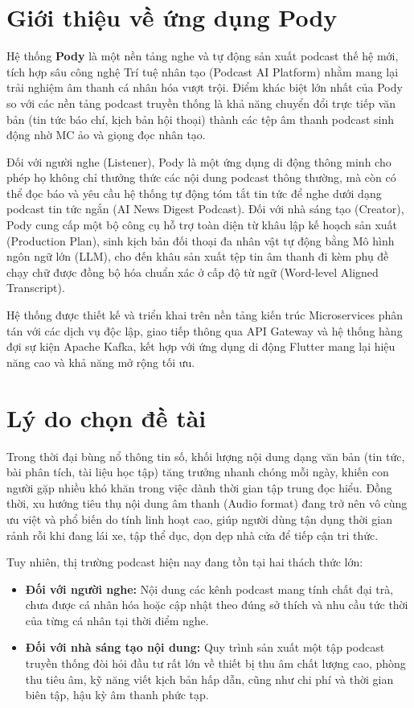 \documentclass[12pt,a4paper]{report}
\begin{document}
\section{Giới thiệu về ứng dụng Pody}
Hệ thống \textbf{Pody} là một nền tảng nghe và tự động sản xuất podcast thế hệ mới, tích hợp sâu công nghệ Trí tuệ nhân tạo (Podcast AI Platform) nhằm mang lại trải nghiệm âm thanh cá nhân hóa vượt trội. Điểm khác biệt lớn nhất của Pody so với các nền tảng podcast truyền thống là khả năng chuyển đổi trực tiếp văn bản (tin tức báo chí, kịch bản hội thoại) thành các tệp âm thanh podcast sinh động nhờ MC ảo và giọng đọc nhân tạo.

Đối với người nghe (Listener), Pody là một ứng dụng di động thông minh cho phép họ không chỉ thưởng thức các nội dung podcast thông thường, mà còn có thể đọc báo và yêu cầu hệ thống tự động tóm tắt tin tức để nghe dưới dạng podcast tin tức ngắn (AI News Digest Podcast). Đối với nhà sáng tạo (Creator), Pody cung cấp một bộ công cụ hỗ trợ toàn diện từ khâu lập kế hoạch sản xuất (Production Plan), sinh kịch bản đối thoại đa nhân vật tự động bằng Mô hình ngôn ngữ lớn (LLM), cho đến khâu sản xuất tệp tin âm thanh đi kèm phụ đề chạy chữ được đồng bộ hóa chuẩn xác ở cấp độ từ ngữ (Word-level Aligned Transcript).

Hệ thống được thiết kế và triển khai trên nền tảng kiến trúc Microservices phân tán với các dịch vụ độc lập, giao tiếp thông qua API Gateway và hệ thống hàng đợi sự kiện Apache Kafka, kết hợp với ứng dụng di động Flutter mang lại hiệu năng cao và khả năng mở rộng tối ưu.

\section{Lý do chọn đề tài}
Trong thời đại bùng nổ thông tin số, khối lượng nội dung dạng văn bản (tin tức, bài phân tích, tài liệu học tập) tăng trưởng nhanh chóng mỗi ngày, khiến con người gặp nhiều khó khăn trong việc dành thời gian tập trung đọc hiểu. Đồng thời, xu hướng tiêu thụ nội dung âm thanh (Audio format) đang trở nên vô cùng ưu việt và phổ biến do tính linh hoạt cao, giúp người dùng tận dụng thời gian rảnh rỗi khi đang lái xe, tập thể dục, dọn dẹp nhà cửa để tiếp cận tri thức.

Tuy nhiên, thị trường podcast hiện nay đang tồn tại hai thách thức lớn:
\begin{itemize}
    \item \textbf{Đối với người nghe:} Nội dung các kênh podcast mang tính chất đại trà, chưa được cá nhân hóa hoặc cập nhật theo đúng sở thích và nhu cầu tức thời của từng cá nhân tại thời điểm nghe.
    \item \textbf{Đối với nhà sáng tạo nội dung:} Quy trình sản xuất một tập podcast truyền thống đòi hỏi đầu tư rất lớn về thiết bị thu âm chất lượng cao, phòng thu tiêu âm, kỹ năng viết kịch bản hấp dẫn, cũng như chi phí và thời gian biên tập, hậu kỳ âm thanh phức tạp.
\end{itemize}
\end{document}
